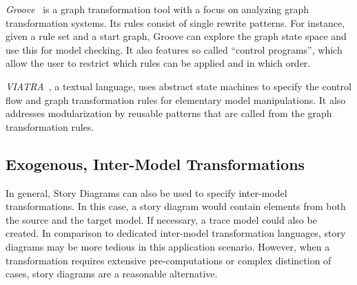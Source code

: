 \emph{Groove}~\cite{Ren04a}  is a graph transformation tool with a focus on analyzing graph transformation systems.
Its rules consist of single rewrite patterns.
For instance, given a rule set and a start graph, Groove can explore the graph state space and use this for model checking.
It also features so called ``control programs'', which allow the user to restrict which rules can be applied and in which order.

\emph{VIATRA}~\cite{viatra}, a textual language, uses abstract state machines to specify the control flow and graph transformation rules for elementary model manipulations.
It also addresses modularization by reusable patterns that are called from the graph transformation rules. 



\subsection{Exogenous, Inter-Model Transformations}

In general, Story Diagrams can also be used to specify inter-model transformations.
In this case, a story diagram would contain elements from both the source and the target model.
If necessary, a trace model could also be created.
In comparison to dedicated inter-model transformation languages, story diagrams may be more tedious in this application scenario.
However, when a transformation requires extensive pre-computations or complex distinction of cases, story diagrams are a reasonable alternative.


